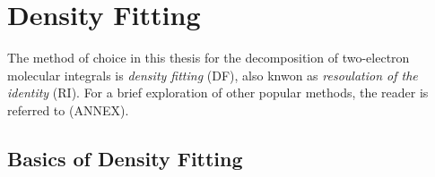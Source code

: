 


\FloatBarrier

\section{Density Fitting}

The method of choice in this thesis for the decomposition of two-electron molecular integrals is \emph{density fitting} (DF), also knwon as \emph{resoulation of the identity} (RI). For a brief exploration of other popular methods, the reader is referred to (ANNEX).  

\subsection{Basics of Density Fitting}

